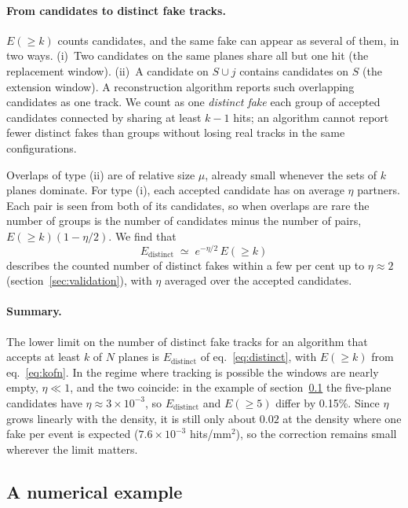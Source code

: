 \IfFileExists{jinst.cls}{\documentclass[a4paper,11pt]{jinst}}
\begin{document}
\paragraph{From candidates to distinct fake tracks.} $E(\ge k)$ counts candidates, and the
same fake can appear as several of them, in two ways. (i)~Two candidates on the same planes
share all but one hit (the replacement window). (ii)~A candidate on $S\cup j$ contains
candidates on $S$ (the extension window). A reconstruction algorithm reports such overlapping
candidates as one track. We count as one \emph{distinct fake} each group of accepted candidates
connected by sharing at least $k-1$ hits; an algorithm cannot report fewer distinct fakes than
groups without losing real tracks in the same configurations.

Overlaps of type (ii) are of relative size $\mu$, already small whenever the sets of $k$ planes
dominate. For type (i), each accepted candidate has on average $\eta$ partners. Each pair is
seen from both of its candidates, so when overlaps are rare the number of groups is the number
of candidates minus the number of pairs, $E(\ge k)(1-\eta/2)$. We find that
\begin{equation}
  E_\mathrm{distinct} \;\simeq\; e^{-\eta/2}\,E(\ge k)
  \label{eq:distinct}
\end{equation}
describes the counted number of distinct fakes within a few per cent up to $\eta\approx2$
(section~\ref{sec:validation}), with $\eta$ averaged over the accepted candidates.

\paragraph{Summary.} The lower limit on the number of distinct fake tracks for an algorithm
that accepts at least $k$ of $N$ planes is $E_\mathrm{distinct}$ of eq.~\eqref{eq:distinct},
with $E(\ge k)$ from eq.~\eqref{eq:kofn}. In the regime where tracking is possible the windows
are nearly empty, $\eta\ll1$, and the two coincide: in the example of section~\ref{sec:example} the
five-plane candidates have $\eta\approx3\times10^{-3}$, so $E_\mathrm{distinct}$ and $E(\ge5)$
differ by 0.15\%. Since $\eta$ grows linearly with the density, it is still only about
$0.02$ at the density where one fake per event is expected ($7.6\times10^{-3}$ hits/mm$^2$),
so the correction remains small wherever the limit matters.

\subsection{A numerical example}\label{sec:example}
\end{document}
